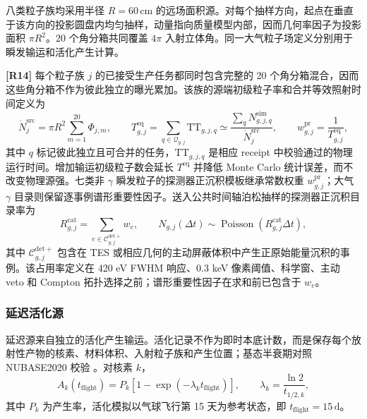 \documentclass[11pt]{article}
\newcommand{\revblue}[1]{\textcolor{revisionblue}{#1}}
\begin{document}
八类粒子族均采用半径 $R=60\,\mathrm{cm}$ 的远场面积源。对每个抽样方向，起点在垂直于该方向的投影圆盘内均匀抽样，动量指向质量模型内部，因而几何率因子为投影面积 $\pi R^2$。20 个角分箱共同覆盖 $4\pi$ 入射立体角。同一大气粒子场定义分别用于瞬发输运和活化产生计算。

\begingroup
\color{revisionblue}
\noindent\textbf{[R14]} 每个粒子族 $j$ 的已接受生产任务都同时包含完整的 20 个角分箱混合，因而这些角分箱不作为彼此独立的曝光累加。该族的源端初级粒子率和合并等效照射时间定义为
\begin{equation}
 \dot N^{\mathrm{src}}_{j}=\pi R^2\sum_{m=1}^{20}\Phi_{j,m},
 \qquad
 T^{\mathrm{eq}}_{g,j}=\sum_{q\in\mathcal Q_{g,j}}\mathrm{TT}_{g,j,q}
 \simeq
 \frac{\sum_q N^{\mathrm{sim}}_{g,j,q}}{\dot N^{\mathrm{src}}_{j}},
 \qquad
 w^{\mathrm{pr}}_{g,j}=\frac{1}{T^{\mathrm{eq}}_{g,j}},
 \label{eq:prompt_equivalent_exposure_zh}
\end{equation}
其中 $q$ 标记彼此独立且可合并的任务，$\mathrm{TT}_{g,j,q}$ 是相应 receipt 中校验通过的物理运行时间。增加输运初级粒子数会延长 $T^{\mathrm{eq}}$ 并降低 Monte Carlo 统计误差，而不改变物理源强。七类非 $\gamma$ 瞬发粒子的探测器正沉积模板继承常数权重 $w^{\mathrm{pr}}_{g,j}$；\revblue{大气 $\gamma$ 目录}则保留逐事例谱形重要性因子。送入公共时间轴泊松抽样的探测器正沉积目录率为
\begin{equation}
 R^{\mathrm{cat}}_{g,j}=\sum_{e\in\mathcal C^{\mathrm{det+}}_{g,j}}w_e,
 \qquad
 N_{g,j}(\Delta t)\sim
 \operatorname{Poisson}\!\left(R^{\mathrm{cat}}_{g,j}\Delta t\right),
 \label{eq:catalog_poisson_rate_zh}
\end{equation}
其中 $\mathcal C^{\mathrm{det+}}_{g,j}$ 包含在 TES 或相应几何的主动屏蔽体积中产生正原始能量沉积的事例。该占用率定义在 420 eV FWHM 响应、0.3 keV 像素阈值、科学窗、主动 veto 和 Compton 拓扑选择之前；谱形重要性因子在求和前已包含于 $w_e$。
\endgroup

\subsubsection{延迟活化源}
\label{subsec:delayed_source}

延迟源来自独立的活化产生输运。活化记录不作为即时本底计数，而是保存每个放射性产物的核素、材料体积、入射粒子族和产生位置；基态半衰期对照 NUBASE2020 校验 \cite{Kondev2021NUBASE}。对核素 $k$，
\begin{equation}
  A_k(t_{\mathrm{flight}})=P_k\left[1-\exp(-\lambda_k t_{\mathrm{flight}})\right],
  \qquad \lambda_k=\frac{\ln2}{t_{1/2,k}},
\end{equation}
其中 $P_k$ 为产生率，活化模拟以气球飞行第 15 天为参考状态，即
$t_{\mathrm{flight}}=15\,\mathrm{d}$。
\end{document}
